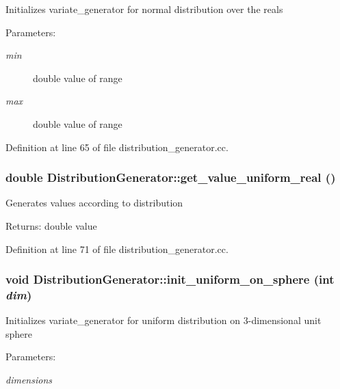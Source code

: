 Initializes variate\_\-generator for normal distribution over the reals \begin{Desc}
\item[Parameters:]
\begin{description}
\item[{\em min}]double value of range \item[{\em max}]double value of range \end{description}
\end{Desc}


Definition at line 65 of file distribution\_\-generator.cc.\hypertarget{class_distribution_generator_0d7089a0e10b8fad8a70b2e1c8b23ba6}{
\subsubsection[get\_\-value\_\-uniform\_\-real]{\setlength{\rightskip}{0pt plus 5cm}double DistributionGenerator::get\_\-value\_\-uniform\_\-real ()}}
\label{class_distribution_generator_0d7089a0e10b8fad8a70b2e1c8b23ba6}


Generates values according to distribution \begin{Desc}
\item[Returns:]double value \end{Desc}


Definition at line 71 of file distribution\_\-generator.cc.\hypertarget{class_distribution_generator_66a05089faa08bf8939496f87c2672ef}{
\subsubsection[init\_\-uniform\_\-on\_\-sphere]{\setlength{\rightskip}{0pt plus 5cm}void DistributionGenerator::init\_\-uniform\_\-on\_\-sphere (int {\em dim})}}
\label{class_distribution_generator_66a05089faa08bf8939496f87c2672ef}


Initializes variate\_\-generator for uniform distribution on 3-dimensional unit sphere \begin{Desc}
\item[Parameters:]
\begin{description}
\item[{\em dimensions}]\end{description}
\end{Desc}


